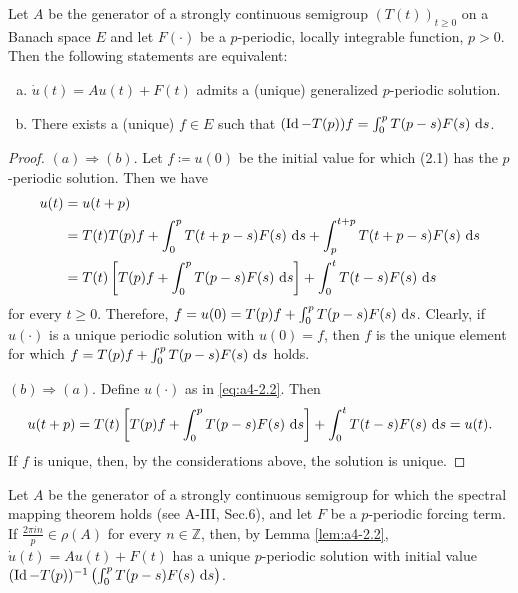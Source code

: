 \begin{lemma}\label{lem:a4-2.2}
Let $A$ be the generator of a strongly continuous semigroup $(T(t))_{t \geq 0}$ on a Banach space $E$ and let $F(\cdot)$ be a $p$-periodic, locally integrable function, $p > 0$. 
Then the following statements are equivalent:
\begin{enumerate}[(a)]
\item $\dot{u}(t) = Au(t) + F(t)$ admits a (unique) generalized $p$-periodic solution.
\item There exists a (unique) $f \in E$ such that $(\operatorname{Id} - T(p))f = \int_{0}^{p} T(p-s)F(s) \,\mathop{}\!\mathrm{d}{s}$.
\end{enumerate}
\end{lemma}

\begin{proof}
$(a) \Rightarrow (b)$. 
Let $f \coloneqq u(0)$ be the initial value for which (2.1) has the $p$-periodic solution. 
Then we have
\begin{align*}
u(t) &= u(t+p) \\
&= T(t)T(p)f + \int_{0}^{p} T(t+p-s)F(s) \,\mathop{}\!\mathrm{d}{s} + \int_{p}^{t+p} T(t+p-s)F(s) \,\mathop{}\!\mathrm{d}{s} \\
&= T(t)\left[T(p)f + \int_{0}^{p} T(p-s)F(s) \,\mathop{}\!\mathrm{d}{s}\right] + \int_{0}^{t} T(t-s)F(s) \,\mathop{}\!\mathrm{d}{s}
\end{align*}
for every $t \geq 0$. 
Therefore, $f = u(0) = T(p)f + \int_{0}^{p} T(p-s)F(s) \,\mathop{}\!\mathrm{d}{s}$.
Clearly, if $u(\cdot)$ is a unique periodic solution with $u(0) = f$, then $f$ is the unique element for which $f = T(p)f + \int_{0}^{p} T(p-s)F(s) \,\mathop{}\!\mathrm{d}{s}$ holds.

\medskip\noindent
$(b) \Rightarrow (a)$. 
Define $u(\cdot)$ as in \eqref{eq:a4-2.2}. 
Then
\begin{align*}
u(t+p) = T(t)\left[T(p)f + \int_{0}^{p} T(p-s)F(s) \,\mathop{}\!\mathrm{d}{s}\right] + \int_{0}^{t} T(t-s)F(s) \,\mathop{}\!\mathrm{d}{s} = u(t).
\end{align*}
If $f$ is unique, then, by the considerations above, the solution is unique.
\end{proof}

\begin{remark}\label{rem:a4-2.3}
Let $A$ be the generator of a strongly continuous semigroup for which the spectral mapping theorem holds (see A-III, Sec.6), and let $F$ be a $p$-periodic forcing term.
If $\frac{2\pi in}{p} \in \rho(A)$ for every $n \in \mathbb{Z}$, then, by Lemma \ref{lem:a4-2.2}, $\dot{u}(t) = Au(t) + F(t)$ has a unique $p$-periodic solution with initial value $(\operatorname{Id} - T(p))^{-1} \left(\int_{0}^{p} T(p-s)F(s) \,\mathop{}\!\mathrm{d}{s}\right)$.
\end{remark}

